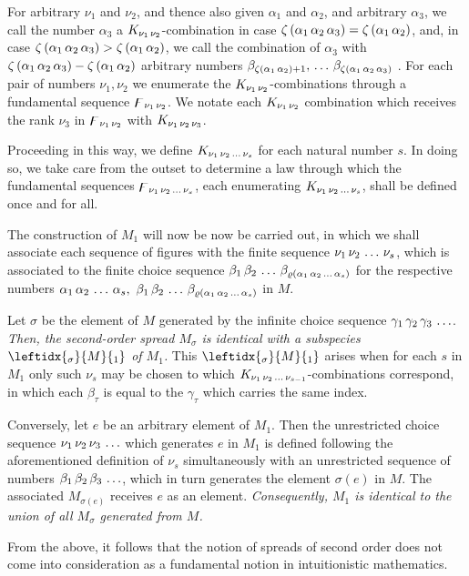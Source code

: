 \documentclass{amsart}
\newcommand\Rank[1]{\varrho\left(#1\right)}
\newcommand\Max[1]{\zeta\left(#1\right)}
\begin{document}
For arbitrary $\nu_1$ and $\nu_2$, and thence also given $\alpha_1$ and
$\alpha_2$, and arbitrary $\alpha_3$, we call the number $\alpha_3$ a
$K_{\Sequence{\nu_1,\nu_2}}$-combination in case $\Max{\Sequence{\alpha_1,\alpha_2,\alpha_3}} =
\Max{\Sequence{\alpha_1,\alpha_2}}$, and, in case $\Max{\Sequence{\alpha_1,\alpha_2,\alpha_3}} >
\Max{\Sequence{\alpha_1,\alpha_2}}$, we  call the combination of
$\alpha_3$ with $\Max{\Sequence{\alpha_1,\alpha_2,\alpha_3}} - \Max{\Sequence{\alpha_1,\alpha_2}}$
arbitrary numbers $\beta_{\Max{\Sequence{\alpha_1,\alpha_2}} +
1},\,\dots\,\beta_{\Max{\Sequence{\alpha_1,\alpha_2,\alpha_3}}}$ . For each pair of numbers $\nu_1,
\nu_2$ we enumerate the $K_{\Sequence{\nu_1,\nu_2}}$-combinations through a
fundamental sequence $\digamma_{\Sequence{\nu_1,\nu_2}}$. We notate each
$K_{\Sequence{\nu_1,\nu_2}}$ combination which receives the rank $\nu_3$ in
$\digamma_{\Sequence{\nu_1,\nu_2}}$ with $K_{\Sequence{\nu_1,\nu_2,\nu_3}}$.

Proceeding in this way, we define $K_{\Sequence{\nu_1,\nu_2,\dots,\nu_s}}$ for each natural
number $s$. In doing so, we take care from the outset to determine a
law through which the fundamental sequences $\digamma_{\Sequence{\nu_1,\nu_2,\dots,\nu_s}}$,
each enumerating $K_{\Sequence{\nu_1,\nu_2,\dots,\nu_s}}$, shall be defined once and for all.

The construction of $M_1$ will now be now be carried out, in which we shall
associate each sequence of figures with the finite sequence
$\Sequence{\nu_1,\nu_2,\dots,\nu_s}$, which is associated to the finite choice sequence
$\Sequence{\beta_1,\beta_2,\dots,\beta_{\Rank{\Sequence{\alpha_1,\alpha_2,\dots,\alpha_s}}}}$
for the respective numbers $\Sequence{\alpha_1,\alpha_2,\dots,\alpha_s},\
\Sequence{\beta_1,\beta_2,\dots,\beta_{\Rank{\Sequence{\alpha_1,\alpha_2,\dots,\alpha_s}}}}$
in $M$.

\bigskip

Let $\sigma$ be the element of $M$ generated by the infinite choice sequence
$\Sequence{\gamma_1,\gamma_2,\gamma_3,\dots}$. \emph{Then, the second-order
spread $M_\sigma$ is identical with a subspecies $\leftidx{_\sigma}{M}{_1}$ of
$M_1$.} This $\leftidx{_\sigma}{M}{_1}$ arises when for each $s$ in $M_1$ only
such $\nu_s$ may be chosen to which
$K_{\Sequence{\nu_1,\nu_2,\dots,\nu_{s-1}}}$-combinations correspond, in which
each $\beta_\tau$ is equal to the $\gamma_\tau$ which carries the same
index.

Conversely, let $e$ be an arbitrary element of $M_1$. Then the unrestricted
choice sequence $\Sequence{\nu_1,\nu_2,\nu_3,\dots}$ which generates $e$ in
$M_1$ is defined following the aforementioned definition of $\nu_s$
simultaneously with an unrestricted sequence of numbers
$\Sequence{\beta_1,\beta_2,\beta_3,\dots}$, which in turn generates the element
$\sigma(e)$ in $M$. The associated $M_{\sigma(e)}$ receives $e$ as an element.
\emph{Consequently, $M_1$ is identical to the union of all $M_\sigma$ generated
from $M$.}

From the above, it follows that the notion of spreads of second order does not
come into consideration as a fundamental notion in intuitionistic mathematics.
\end{document}
